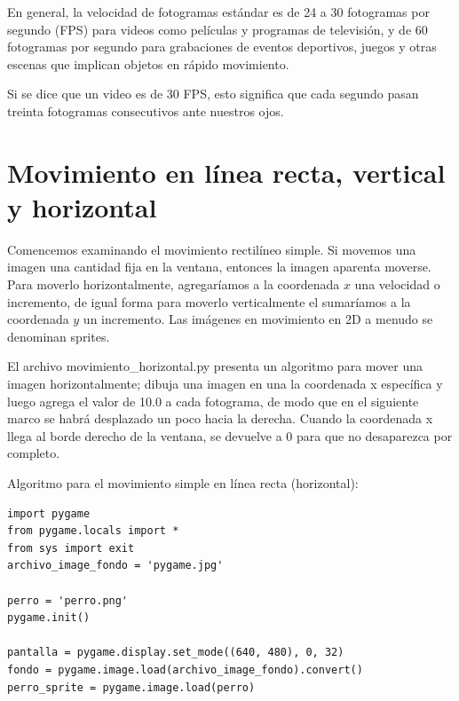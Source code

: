 {En general, la velocidad de fotogramas estándar es de 24 a 30 fotogramas por segundo (FPS) para videos como películas y programas de televisión,  y de 60 fotogramas por segundo para grabaciones de eventos deportivos, juegos y otras escenas que implican objetos en rápido movimiento.

Si se dice que un video es de 30 FPS, esto significa que cada segundo  pasan treinta fotogramas consecutivos ante nuestros ojos.


\section{Movimiento en línea recta, vertical y horizontal}


Comencemos examinando el movimiento rectilíneo simple. 
Si movemos una imagen una cantidad fija en la ventana, entonces la imagen aparenta  moverse. Para moverlo horizontalmente, agregaríamos a la coordenada $x$ una velocidad o incremento, de igual forma para moverlo verticalmente el sumaríamos a la coordenada $y$ un incremento. 
Las imágenes en movimiento en 2D a menudo se denominan {\ttfamily sprites}.



El archivo {\ttfamily movimiento\_horizontal.py} presenta un algoritmo para mover una imagen horizontalmente; dibuja una imagen en una la coordenada {\ttfamily x} específica  y luego agrega el valor de 10.0 a cada fotograma, de modo que en el siguiente
marco se habrá desplazado un poco hacia la derecha. Cuando la coordenada {\ttfamily x} llega al borde derecho de la ventana,
se devuelve a 0 para que no desaparezca por completo. 

Algoritmo para el movimiento simple en línea recta (horizontal):

\hspace{-2.85cm}{\ttfamily \scriptsize movimiento}

\vspace{-0.25cm}
\hspace{-2.95cm}{\ttfamily \scriptsize \_horizontal.py}\vspace{-0.87cm}
\begin{lstlisting}		
import pygame
from pygame.locals import *
from sys import exit
archivo_image_fondo = 'pygame.jpg'

perro = 'perro.png'
pygame.init()

pantalla = pygame.display.set_mode((640, 480), 0, 32)
fondo = pygame.image.load(archivo_image_fondo).convert()
perro_sprite = pygame.image.load(perro)


\end{lstlisting}}
